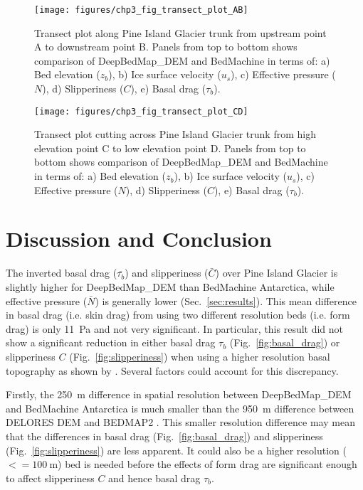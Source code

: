 \begin{figure}[htbp]
  \texttt{[image: figures/chp3\_fig\_transect\_plot\_AB]}
  \caption[Transect plot along Pine Island Glacier trunk]{
    Transect plot along Pine Island Glacier trunk from upstream point A to downstream point B.
    Panels from top to bottom shows comparison of DeepBedMap\_DEM and BedMachine in terms of:
    a) Bed elevation ($z_b$),
    b) Ice surface velocity ($u_s$),
    c) Effective pressure ($N$),
    d) Slipperiness ($C$),
    e) Basal drag ($\tau_b$).
  }
  \label{fig:transect_AB}
\end{figure}

\begin{figure}[htbp]
  \texttt{[image: figures/chp3\_fig\_transect\_plot\_CD]}
  \caption[Transect plot cutting across Pine Island Glacier trunk]{
    Transect plot cutting across Pine Island Glacier trunk from high elevation point C to low elevation point D.
    Panels from top to bottom shows comparison of DeepBedMap\_DEM and BedMachine in terms of:
    a) Bed elevation ($z_b$),
    b) Ice surface velocity ($u_s$),
    c) Effective pressure ($N$),
    d) Slipperiness ($C$),
    e) Basal drag ($\tau_b$).
  }
  \label{fig:transect_CD}
\end{figure}


\clearpage
\section{Discussion and Conclusion}

The inverted basal drag ($\bar{\tau_b}$) and slipperiness ($\bar{C}$) over Pine Island Glacier is slightly higher for DeepBedMap\_DEM than BedMachine Antarctica, while effective pressure ($\bar{N}$) is generally lower (Sec.~\ref{sec:results}).
This mean difference in basal drag (i.e. skin drag) from using two different resolution beds (i.e. form drag) is only \SI{11}{\pascal} and not very significant.
In particular, this result did not show a significant reduction in either basal drag $\tau_b$ (Fig.~\ref{fig:basal_drag}) or slipperiness $C$ (Fig.~\ref{fig:slipperiness}) when using a higher resolution basal topography as shown by \citet{Kyrke-SmithRelevanceDetailBasal2018}.
Several factors could account for this discrepancy.

Firstly, the \SI{250}{\metre} difference in spatial resolution between DeepBedMap\_DEM \citep{LeongDeepBedMap2020} and BedMachine Antarctica \citep{MorlighemMEaSUREsBedMachineAntarctica2020} is much smaller than the \SI{950}{\metre} difference between DELORES DEM \citep{BinghamDiverselandscapesPine2017} and BEDMAP2 \citep{FretwellBedmap2improvedice2013}.
This smaller resolution difference may mean that the differences in basal drag (Fig.~\ref{fig:basal_drag}) and slipperiness (Fig.~\ref{fig:slipperiness}) are less apparent.
It could also be a higher resolution ($<= \SI{100}{\metre}$) bed is needed \citep[e.g.][]{Grahamhighresolutionsyntheticbed2017} before the effects of form drag are significant enough to affect slipperiness $C$ and hence basal drag $\tau_b$.

